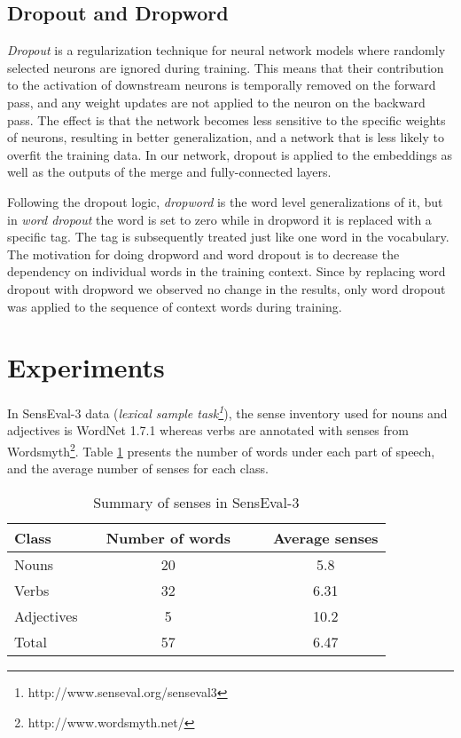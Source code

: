 \documentclass{llncs}
\begin{document}
\subsection{Dropout and Dropword}
\textit{Dropout} \cite{srivastava2014dropout} is a regularization technique for neural network models where randomly selected neurons are ignored during training. This means that their contribution to the activation of downstream neurons is temporally removed on the forward pass, and any weight updates are not applied to the neuron on the backward pass. The effect is that the network becomes less sensitive to the specific weights of neurons, resulting in better generalization, and a network that is less likely to overfit the training data. In our network, dropout is applied to the embeddings as well as the outputs of the merge and fully-connected layers.

Following the dropout logic, \textit{dropword} \cite{iyyer2015deep} is the word level generalizations of it, but in \textit{word dropout} the word is set to zero while in dropword it is replaced with a specific tag. The tag is subsequently treated just like one word in the vocabulary. The motivation for doing dropword and word dropout is to decrease the dependency on individual words in the training context. Since by replacing word dropout with dropword we observed no change in the results, only word dropout was applied to the sequence of context words during training.  

\section{Experiments}
In SensEval-3 data (\textit{lexical sample task\footnote{http://www.senseval.org/senseval3}}), the sense inventory used for nouns and adjectives
is WordNet 1.7.1 \cite{miller1995wordnet} whereas verbs are annotated with senses from Wordsmyth\footnote{http://www.wordsmyth.net/}. Table \ref{table:SensEval-3-summary} presents the number of words under each part of speech, and the average number of senses for each class.
\begin{table}[]
	\centering
	\caption{Summary of senses in SensEval-3}
	\label{table:SensEval-3-summary}
	\begin{tabular}{@{}llcllc@{}}
		\toprule
		\textbf{Class}      &  & \textbf{Number of words} &  &  & \textbf{Average senses} \\ \midrule
		Nouns      &  & 20              &  &  & 5.8            \\
		Verbs      &  & 32              &  &  & 6.31           \\
		Adjectives &  & 5               &  &  & 10.2           \\ \midrule
		Total      &  & 57              &  &  & 6.47           \\ \bottomrule
	\end{tabular}
\end{table}
\end{document}
